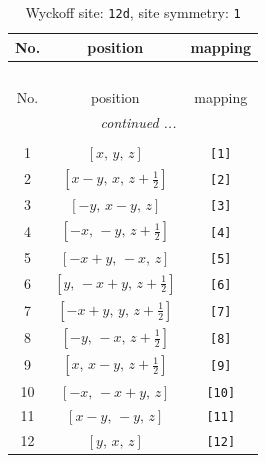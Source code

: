 \documentclass[fleqn,8pt]{jsarticle}
\begin{document}
\begin{longtable}{ccc}
\caption{Wyckoff site: {\tt 12d}, site symmetry: {\tt 1}}
 \\
 \hline \hline
No. & position & mapping \\ \hline \endfirsthead

\multicolumn{2}{l}{\tablename\ \thetable{}} \\
 \hline \hline
No. & position & mapping \\ \hline \endhead

 \hline \hline
\multicolumn{2}{r}{\footnotesize\it continued ...} \\ \endfoot

 \hline \hline
\multicolumn{2}{r}{} \\ \endlastfoot

1 & $\left[ x,\, y,\, z \right]$ & {\tt [1]} \\ \hline
2 & $\left[ x - y,\, x,\, z + \frac{1}{2} \right]$ & {\tt [2]} \\ \hline
3 & $\left[ - y,\, x - y,\, z \right]$ & {\tt [3]} \\ \hline
4 & $\left[ - x,\, - y,\, z + \frac{1}{2} \right]$ & {\tt [4]} \\ \hline
5 & $\left[ - x + y,\, - x,\, z \right]$ & {\tt [5]} \\ \hline
6 & $\left[ y,\, - x + y,\, z + \frac{1}{2} \right]$ & {\tt [6]} \\ \hline
7 & $\left[ - x + y,\, y,\, z + \frac{1}{2} \right]$ & {\tt [7]} \\ \hline
8 & $\left[ - y,\, - x,\, z + \frac{1}{2} \right]$ & {\tt [8]} \\ \hline
9 & $\left[ x,\, x - y,\, z + \frac{1}{2} \right]$ & {\tt [9]} \\ \hline
10 & $\left[ - x,\, - x + y,\, z \right]$ & {\tt [10]} \\ \hline
11 & $\left[ x - y,\, - y,\, z \right]$ & {\tt [11]} \\ \hline
12 & $\left[ y,\, x,\, z \right]$ & {\tt [12]} \\
\end{longtable}
\end{document}

